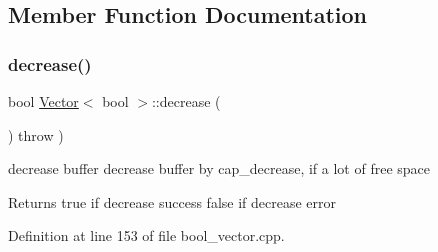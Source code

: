 \subsection{Member Function Documentation}
\mbox{\label{classVector_3_01bool_01_4_a39afbd4a74eac5e2eb4363eed1f98adf}} 
\subsubsection{\texorpdfstring{decrease()}{decrease()}}
{\footnotesize\ttfamily bool \hyperlink{classVector}{Vector}$<$ bool $>$\+::decrease (\begin{DoxyParamCaption}{ }\end{DoxyParamCaption}) throw  ) \hspace{0.3cm}{\ttfamily [private]}}



decrease buffer  decrease buffer by cap\+\_\+decrease, if a lot of free space 

\begin{DoxyReturn}{Returns}
true if decrease success false if decrease error 
\end{DoxyReturn}


Definition at line 153 of file bool\+\_\+vector.\+cpp.


